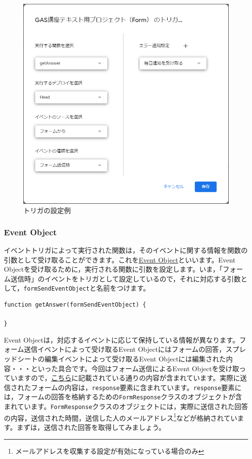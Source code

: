 \documentclass[uplatex,a4j]{jsarticle}
\begin{document}
\begin{figure}[H]
 \centering
 \includegraphics[keepaspectratio, scale=0.7]{images/trigger_edit.png}
 \caption{トリガの設定例}
 \label{fig:trigger_edit}
\end{figure}

\subsubsection{Event Object}

イベントトリガによって実行された関数は，そのイベントに関する情報を関数の引数として受け取ることができます。これを\href{https://developers.google.com/apps-script/guides/triggers/events?hl=en}{Event Object}といいます。Event Objectを受け取るために，実行される関数に引数を設定します。いま，「フォーム送信時」のイベントをトリガとして設定しているので，それに対応する引数として，\verb|formSendEventObject|と名前をつけます。

\begin{lstlisting}[basicstyle=\ttfamily\footnotesize,frame=single,caption=Event Object sample 1]
function getAnswer(formSendEventObject) {
  
}
\end{lstlisting}

Event Objectは，対応するイベントに応じて保持している情報が異なります。フォーム送信イベントによって受け取るEvent Objectにはフォームの回答，スプレッドシートの編集イベントによって受け取るEvent Objectには編集された内容・・・といった具合です。今回はフォーム送信によるEvent Objectを受け取っていますので，\href{https://developers.google.com/apps-script/guides/triggers/events?hl=en#form-submit_1}{こちら}に記載されている通りの内容が含まれています。実際に送信されたフォームの内容は，\verb|response|要素に含まれています。\verb|response|要素には，フォームの回答を格納するための\verb|FormResponse|クラスのオブジェクトが含まれています。\verb|FormResponse|クラスのオブジェクトには，実際に送信された回答の内容，送信された時間，送信した人のメールアドレス\footnote{メールアドレスを収集する設定が有効になっている場合のみ}などが格納されています。まずは，送信された回答を取得してみましょう。
\end{document}
